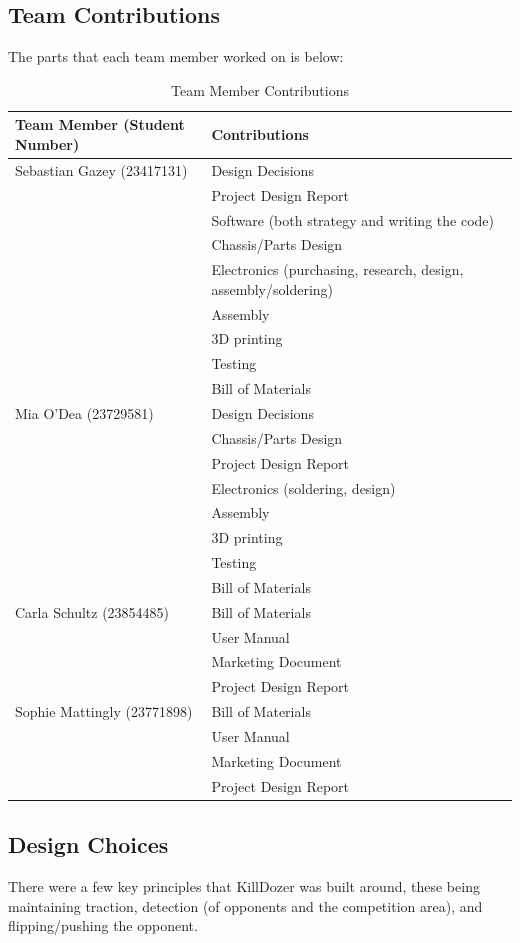\documentclass[11pt]{article}
\begin{document}
\subsection*{Team Contributions}
\label{sec:org9810dfb}
The parts that each team member worked on is below:
\begin{table}[htbp]
\caption{Team Member Contributions}
\centering
\begin{tabularx}{\textwidth}{|X|X|}
\toprule
\textbf{Team Member (Student Number)} & \textbf{Contributions}\\
\midrule
Sebastian Gazey (23417131) & Design Decisions\\
 & Project Design Report\\
 & Software (both strategy and writing the code)\\
 & Chassis/Parts Design\\
 & Electronics (purchasing, research, design, assembly/soldering)\\
 & Assembly\\
 & 3D printing\\
 & Testing\\
 & Bill of Materials\\
\midrule
Mia O'Dea (23729581) & Design Decisions\\
 & Chassis/Parts Design\\
 & Project Design Report\\
 & Electronics (soldering, design)\\
 & Assembly\\
 & 3D printing\\
 & Testing\\
 & Bill of Materials\\
\midrule
Carla Schultz (23854485) & Bill of Materials\\
 & User Manual\\
 & Marketing Document\\
 & Project Design Report\\
\midrule
Sophie Mattingly (23771898) & Bill of Materials\\
 & User Manual\\
 & Marketing Document\\
 & Project Design Report\\
\bottomrule
\end{tabularx}
\end{table}
\subsection*{Design Choices}
\label{sec:orge2fd762}
There were a few key principles that KillDozer was built around, these being maintaining traction, detection (of opponents and the competition area), and flipping/pushing the opponent.
\end{document}
